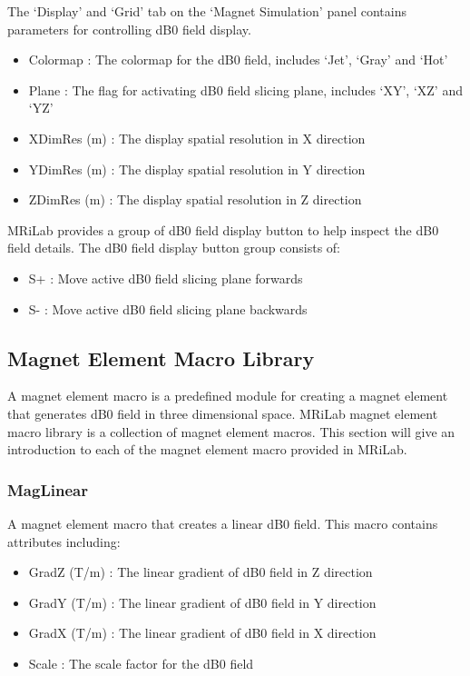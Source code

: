 \documentclass{book}%
\begin{document}
\begin{enumerate}
The `Display' and `Grid' tab on the `Magnet Simulation' panel contains parameters for controlling dB0 field display.

\begin{itemize}
	\item Colormap : The colormap for the dB0 field, includes `Jet', `Gray' and `Hot'
	\item Plane : The flag for activating dB0 field slicing plane, includes `XY', `XZ' and `YZ'
	\item XDimRes (m) : The display spatial resolution in X direction
	\item YDimRes (m) : The display spatial resolution in Y direction
	\item ZDimRes (m) : The display spatial resolution in Z direction
\end{itemize}	

\end{enumerate}

MRiLab provides a group of dB0 field display button to help inspect the dB0 field details. The dB0 field display button group consists of:

\begin{itemize}
	\item S+ : Move active dB0 field slicing plane forwards
	\item S- : Move active dB0 field slicing plane backwards
\end{itemize}

\subsection{Magnet Element Macro Library}

A magnet element macro is a predefined module for creating a magnet element that generates dB0 field in three dimensional space. MRiLab magnet element macro library is a collection of magnet element macros. This section will give an introduction to each of the magnet element macro provided in MRiLab.

\subsubsection{MagLinear}

A magnet element macro that creates a linear dB0 field. This macro contains attributes including:

\begin{itemize}
	\item GradZ (T/m) : The linear gradient of dB0 field in Z direction
  \item GradY (T/m) : The linear gradient of dB0 field in Y direction
	\item GradX (T/m) : The linear gradient of dB0 field in X direction
	\item Scale : The scale factor for the dB0 field
\end{itemize}
\end{document}
